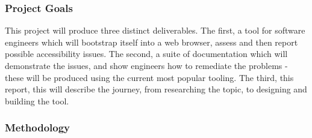 \subsubsection{Project Goals}
This project will produce three distinct deliverables. The first, a tool for software engineers which will bootstrap itself into a web
browser, assess and then report possible accessibility issues. The second, a suite of documentation which will demonstrate the issues, and
show engineers how to remediate the problems - these will be produced using the current most popular tooling. The third, this report,
this will describe the journey, from researching the topic, to designing and building the tool.

\subsubsection{Methodology}
